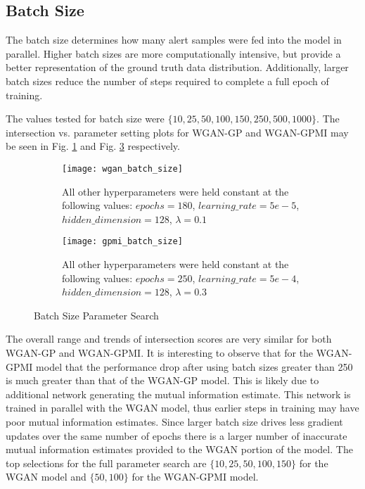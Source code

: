 \subsection{Batch Size}
\label{sec:bs}

The batch size determines how many alert samples were fed into the model in parallel. Higher batch sizes are more computationally intensive, but provide a better representation of the ground truth data distribution. Additionally, larger batch sizes reduce the number of steps required to complete a full epoch of training.

The values tested for batch size were $\{10, 25, 50, 100, 150, 250, 500, 1000\}$. The intersection vs. parameter setting plots for WGAN-GP and WGAN-GPMI may be seen in Fig. \ref{fig:wgan_batch_size} and Fig. \ref{fig:gpmi_batch_size} respectively.

\begin{figure}[!htbp]
	\centering
	\begin{subfigure}{.7\textwidth}
		\texttt{[image: wgan\_batch\_size]}
	\end{subfigure}%
	\begin{subfigure}{.3\textwidth}
		\caption{
			All other hyperparameters were held constant at the following values: $epochs=180$, $learning\_rate=5e-5$, $hidden\_dimension=128$, $\lambda=0.1$
		}
		\label{fig:wgan_batch_size}
	\end{subfigure}%

	\begin{subfigure}{.7\textwidth}
		\texttt{[image: gpmi\_batch\_size]}
	\end{subfigure}%
	\begin{subfigure}{.3\textwidth}
		\caption{
			All other hyperparameters were held constant at the following values: $epochs=250$, $learning\_rate=5e-4$, $hidden\_dimension=128$, $\lambda=0.3$
		}
		\label{fig:gpmi_batch_size}
	\end{subfigure}%
	\caption{Batch Size Parameter Search}
\end{figure}

The overall range and trends of intersection scores are very similar for both WGAN-GP and WGAN-GPMI. It is interesting to observe that for the WGAN-GPMI model that the performance drop after using batch sizes greater than 250 is much greater than that of the WGAN-GP model. This is likely due to additional network generating the mutual information estimate. This network is trained in parallel with the WGAN model, thus earlier steps in training may have poor mutual information estimates. Since larger batch size drives less gradient updates over the same number of epochs there is a larger number of inaccurate mutual information estimates provided to the WGAN portion of the model. The top selections for the full parameter search are $\{10,25,50,100,150\}$ for the WGAN model and $\{50,100\}$ for the WGAN-GPMI model.

